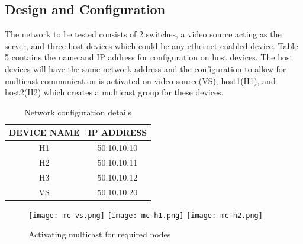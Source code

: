 \documentclass{article}
\begin{document}
\subsection{Design and Configuration}
The network to be tested consists of 2 switches, a video source acting as the server, and three host devices which could be any ethernet-enabled device. Table 5 contains the name and IP address for configuration on host devices. The host devices will have the same network address and the configuration to allow for multicast communication is activated on video source(VS), host1(H1), and host2(H2) which creates a multicast group for these devices.
    	\begin{table}[h]
        		\centering
        		\begin{tabular}{|c|c|}
            		\hline
            		DEVICE NAME & IP ADDRESS \\
            		\hline
            		H1 & 50.10.10.10 \\
            		H2 & 50.10.10.11 \\
            		H3 & 50.10.10.12 \\
            		VS & 50.10.10.20 \\
            		\hline
        		\end{tabular}
        		\caption{Network configuration details}
        		\label{tab:5}
    	\end{table}
    	\begin{figure}[h]
        		\centering
        		\texttt{[image: mc-vs.png]}
        		\texttt{[image: mc-h1.png]}
        		\texttt{[image: mc-h2.png]}
        		\caption{Activating multicast for required nodes}
        		\label{fig:t4-1}
    	\end{figure}
\end{document}
